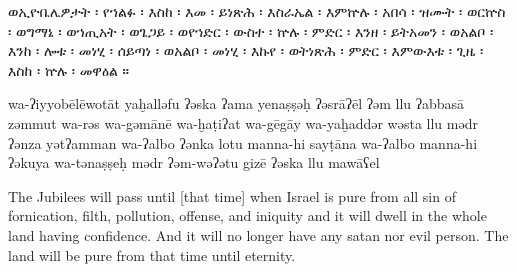 
\begin{ethiopictext}
    ወኢዮቤሌዎታት ፡ የኀልፉ ፡ እስከ ፡ እመ ፡ ይነጽሕ ፡ እስራኤል ፡
    እምኵሉ ፡ አበሳ ፡ ዝሙት ፡ ወርኵስ ፡ ወግማኔ ፡ ወኀጢአት ፡ ወጌጋይ ፡ 
    ወየኀድር ፡ ውስተ ፡ ኵሉ ፡ ምድር ፡ እንዘ ፡ ይትአመን ፡ ወአልቦ ፡
    እንከ ፡ ሎቱ ፡ መነሂ ፡ ሰይጣነ ፡ ወአልቦ ፡ መነሂ ፡ እኩየ ፡ ወትነጽሕ ፡ 
    ምድር ፡ እምውእቱ ፡ ጊዜ ፡ እስከ ፡ ኵሉ ፡ መዋዕል ።
\end{ethiopictext}

\begin{transliteration}
    wa-ʔiyyobēlēwotāt yaḫalləfu ʔəska ʔama yenaṣṣəḥ ʔəsrāʔēl
    ʔəm llu ʔabbasā zəmmut wa-rə\kw{}s wa-gəmānē wa-ḫaṭiʔat wa-gēgāy
    wa-yaḫaddər wəsta llu mədr ʔənza yətʔamman wa-ʔalbo
    ʔənka lotu manna-hi sayṭāna wa-ʔalbo manna-hi ʔəkuya wa-tənaṣṣeḥ
    mədr ʔəm-wəʔətu gizē ʔəska llu mawāʕel
\end{transliteration}

\begin{translation}
    The Jubilees will pass until [that time] when Israel is pure
    from all sin of fornication, filth, pollution, offense, and iniquity
    and it will dwell in the whole land having confidence. And it will no longer have
    any satan nor evil person. The land will be pure from that time until eternity.
\end{translation}